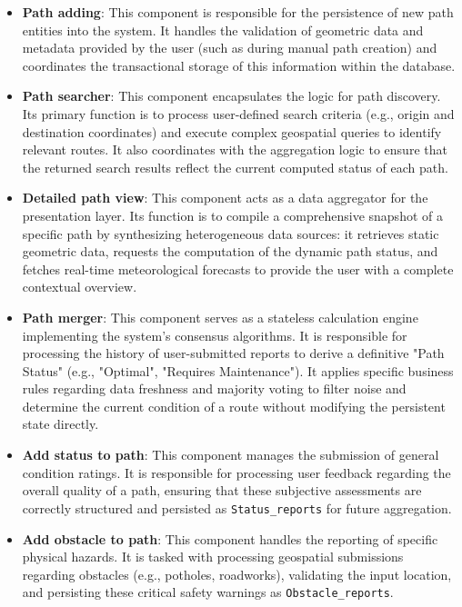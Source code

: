\begin{itemize}
    \item \textbf{Path adding}: This component is responsible for the persistence of new path entities into the system. It handles the validation of geometric data and metadata provided by the user (such as during manual path creation) and coordinates the transactional storage of this information within the database.

    \item \textbf{Path searcher}: This component encapsulates the logic for path discovery. Its primary function is to process user-defined search criteria (e.g., origin and destination coordinates) and execute complex geospatial queries to identify relevant routes. It also coordinates with the aggregation logic to ensure that the returned search results reflect the current computed status of each path.

    \item \textbf{Detailed path view}: This component acts as a data aggregator for the presentation layer. Its function is to compile a comprehensive snapshot of a specific path by synthesizing heterogeneous data sources: it retrieves static geometric data, requests the computation of the dynamic path status, and fetches real-time meteorological forecasts to provide the user with a complete contextual overview.

    \item \textbf{Path merger}: This component serves as a stateless calculation engine implementing the system's consensus algorithms. It is responsible for processing the history of user-submitted reports to derive a definitive "Path Status" (e.g., "Optimal", "Requires Maintenance"). It applies specific business rules regarding data freshness and majority voting to filter noise and determine the current condition of a route without modifying the persistent state directly.

    \item \textbf{Add status to path}: This component manages the submission of general condition ratings. It is responsible for processing user feedback regarding the overall quality of a path, ensuring that these subjective assessments are correctly structured and persisted as \texttt{Status\_reports} for future aggregation.

    \item \textbf{Add obstacle to path}: This component handles the reporting of specific physical hazards. It is tasked with processing geospatial submissions regarding obstacles (e.g., potholes, roadworks), validating the input location, and persisting these critical safety warnings as \texttt{Obstacle\_reports}.
\end{itemize}

